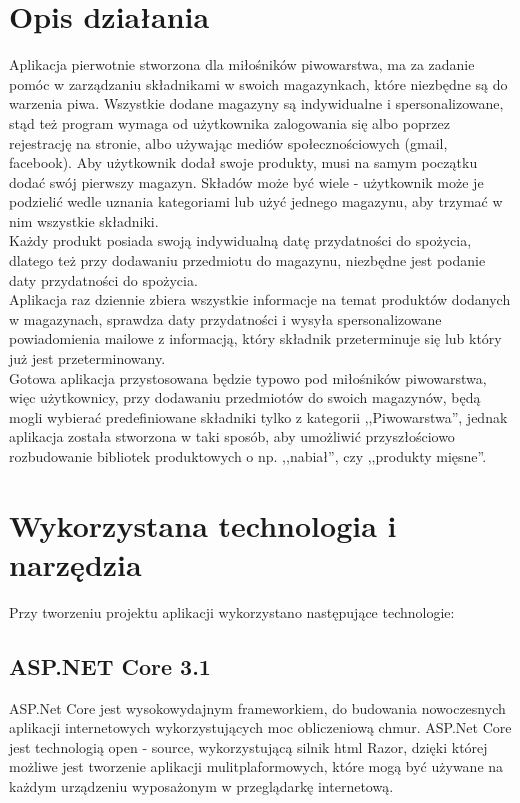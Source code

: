 \documentclass[12pt,a4paper]{article}
\begin{document}
	\section{Opis działania}
		\indent Aplikacja pierwotnie stworzona dla miłośników piwowarstwa, ma za zadanie pomóc w zarządzaniu składnikami w swoich magazynkach, które niezbędne
			są do warzenia piwa. Wszystkie dodane magazyny są indywidualne i spersonalizowane, stąd też program wymaga od użytkownika zalogowania się albo poprzez rejestrację
			na stronie, albo używając mediów społecznościowych (gmail, facebook). Aby użytkownik dodał swoje produkty, musi na samym początku dodać swój pierwszy magazyn.
			Składów może być wiele - użytkownik może je podzielić wedle uznania kategoriami lub użyć jednego magazynu, aby trzymać w nim wszystkie składniki.\\
		\indent Każdy produkt posiada swoją indywidualną datę przydatności do spożycia, dlatego też przy dodawaniu przedmiotu do magazynu, niezbędne jest podanie daty przydatności
			do spożycia.\\
		\indent Aplikacja raz dziennie zbiera wszystkie informacje na temat produktów dodanych w magazynach, sprawdza daty przydatności i wysyła spersonalizowane powiadomienia
			mailowe z informacją, który składnik przeterminuje się lub który już jest przeterminowany.\\
		\indent Gotowa aplikacja przystosowana będzie typowo pod miłośników piwowarstwa, więc użytkownicy, przy dodawaniu przedmiotów do swoich magazynów, będą mogli wybierać
			predefiniowane składniki tylko z kategorii ,,Piwowarstwa'', jednak aplikacja została stworzona w taki sposób, aby umożliwić przyszłościowo rozbudowanie
			bibliotek produktowych o np. ,,nabiał'', czy ,,produkty mięsne''.
	
	\newpage
	\section{Wykorzystana technologia i narzędzia}
		\indent Przy tworzeniu projektu aplikacji wykorzystano następujące technologie:

		\subsection{ASP.NET Core 3.1}
			\indent ASP.Net Core jest wysokowydajnym frameworkiem, do budowania nowoczesnych aplikacji internetowych wykorzystujących moc obliczeniową chmur. ASP.Net Core jest technologią
			open - source, wykorzystującą silnik html Razor, dzięki której możliwe jest tworzenie aplikacji mulitplaformowych, które mogą być używane na każdym urządzeniu wyposażonym
			w przeglądarkę internetową.
\end{document}
